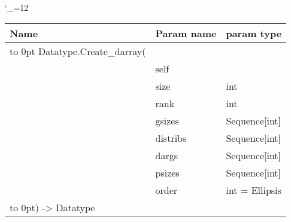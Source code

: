 \begingroup \catcode`\_=12 \tt
\begin{tabular}{lll}
\toprule
\textrm{Name}&\textrm{Param name}&\textrm{param type}\\
\midrule
\hbox to 0pt {Datatype.Create_darray(\hss}\\
& self\\
& size & int\\
& rank & int\\
& gsizes & Sequence[int]\\
& distribs & Sequence[int]\\
& dargs & Sequence[int]\\
& psizes & Sequence[int]\\
& order & int = Ellipsis\\
\hbox to 0pt{) -> Datatype\hss}\\
\bottomrule
\end{tabular}
\endgroup
